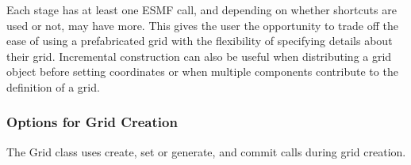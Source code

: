 Each stage has at least one ESMF call, and depending on 
whether shortcuts are used or not, may have more.
This gives the user the opportunity to trade off the 
ease of using a prefabricated grid with the flexibility 
of specifying details about their grid.  Incremental
construction can also be useful when distributing a grid object
before setting coordinates or when multiple components
contribute to the definition of a grid. 

\medskip
\subsubsection{Options for Grid Creation}

The Grid class uses create, set or generate, and 
commit calls during grid creation.



